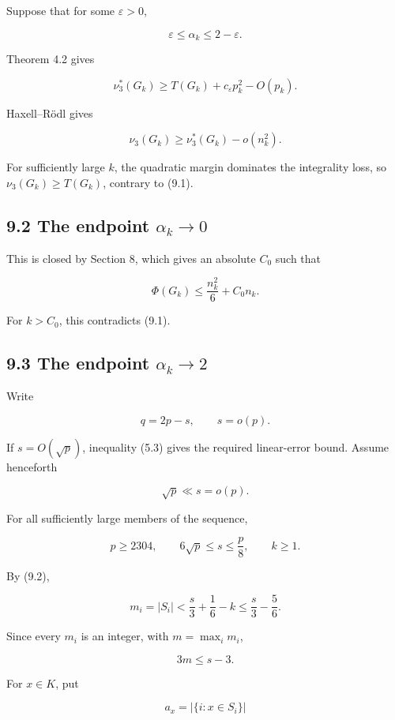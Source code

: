 \documentclass[
  11pt,
]{article}
\begin{document}
Suppose that for some \(\varepsilon>0\),

\[
\varepsilon\le\alpha_k\le2-\varepsilon.
\]

Theorem 4.2 gives

\[
\nu_3^*(G_k)
\ge
T(G_k)+c_\varepsilon p_k^2-O(p_k).
\]

Haxell--Rödl gives

\[
\nu_3(G_k)
\ge
\nu_3^*(G_k)-o(n_k^2).
\]

For sufficiently large \(k\), the quadratic margin dominates the integrality loss, so \(\nu_3(G_k)\ge T(G_k)\), contrary to (9.1).

\subsection{\texorpdfstring{9.2 The endpoint \(\alpha_k\to0\)}{9.2 The endpoint \textbackslash alpha\_k\textbackslash to0}}\label{the-endpoint-alpha_kto0}

This is closed by Section 8, which gives an absolute \(C_0\) such that

\[
\Phi(G_k)
\le
\frac{n_k^2}{6}+C_0n_k.
\]

For \(k>C_0\), this contradicts (9.1).

\subsection{\texorpdfstring{9.3 The endpoint \(\alpha_k\to2\)}{9.3 The endpoint \textbackslash alpha\_k\textbackslash to2}}\label{the-endpoint-alpha_kto2}

Write

\[
q=2p-s,
\qquad
s=o(p).
\]

If \(s=O(\sqrt p)\), inequality (5.3) gives the required linear-error bound. Assume henceforth

\[
\sqrt p\ll s=o(p).
\tag{9.3}
\]

For all sufficiently large members of the sequence,

\[
p\ge2304,
\qquad
6\sqrt p\le s\le\frac p8,
\qquad
k\ge1.
\tag{9.4}
\]

By (9.2),

\[
m_i=|S_i|
<
\frac s3+\frac16-k
\le
\frac s3-\frac56.
\]

Since every \(m_i\) is an integer, with \(m=\max_i m_i\),

\[
\boxed{3m\le s-3.}
\tag{9.5}
\]

For \(x\in K\), put

\[
a_x=|\{i:x\in S_i\}|
\]
\end{document}
